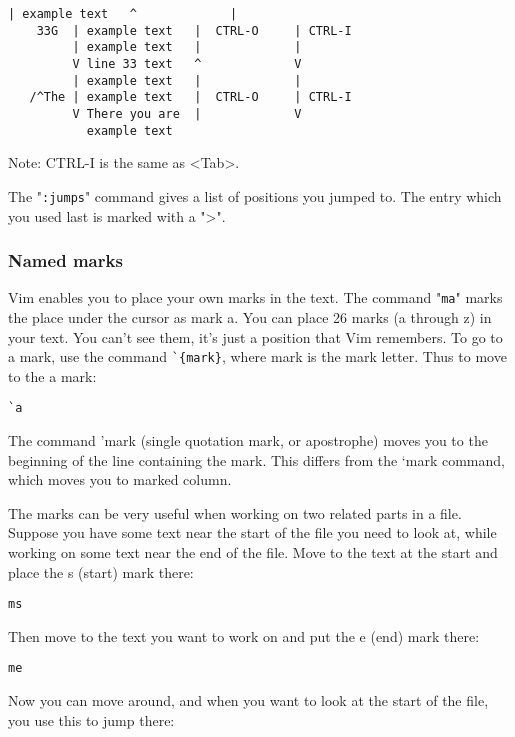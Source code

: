 \begin{Verbatim}[samepage=true]
         | example text   ^             |
    33G  | example text   |  CTRL-O     | CTRL-I
         | example text   |             |
         V line 33 text   ^             V
         | example text   |             |
   /^The | example text   |  CTRL-O     | CTRL-I
         V There you are  |             V
           example text
\end{Verbatim}

Note:
CTRL-I is the same as <Tab>.

The "\verb!:jumps!" command gives a list of positions you jumped to.
The entry which you used last is marked with a ">".

\subsubsection{Named marks}
\label{bookmark}

Vim enables you to place your own marks in the text.
The command "\verb!ma!" marks the place under the cursor as mark a.
You can place 26 marks (a through z) in your text.
You can't see them, it's just a position that Vim remembers.
To go to a mark, use the command \verb!`{mark}!, where {mark} is the mark letter.
Thus to move to the a mark:

 \begin{Verbatim}[samepage=true]
 `a
 \end{Verbatim}

The command 'mark (single quotation mark, or apostrophe) moves you to the beginning of the line containing the mark.
This differs from the `mark command, which moves you to marked column.

The marks can be very useful when working on two related parts in a file.
Suppose you have some text near the start of the file you need to look at, while working on some text near the end of the file.
Move to the text at the start and place the s (start) mark there:

 \begin{Verbatim}[samepage=true]
 ms
 \end{Verbatim}

Then move to the text you want to work on and put the e (end) mark there:

 \begin{Verbatim}[samepage=true]
 me
 \end{Verbatim}

Now you can move around, and when you want to look at the start of the file, you use this to jump there:

